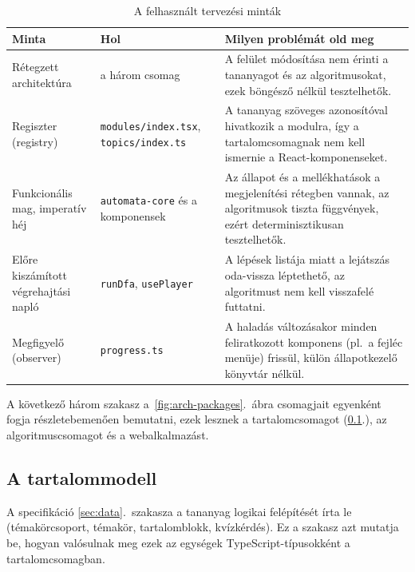 \begin{table}[H]
    \centering
    \begin{tabularx}{\textwidth}{|>{\raggedright\arraybackslash}p{3.2cm}|>{\raggedright\arraybackslash}p{3.6cm}|X|}
        \hline
        \textbf{Minta} & \textbf{Hol} & \textbf{Milyen problémát old meg} \\ \hline
        Rétegzett architektúra & a három csomag &
            A felület módosítása nem érinti a tananyagot és az
            algoritmusokat, ezek böngésző nélkül tesztelhetők. \\ \hline
        Regiszter (registry) & \texttt{modules/index.tsx}, \texttt{topics/index.ts} &
            A tananyag szöveges azonosítóval hivatkozik a modulra, így a
            tartalomcsomagnak nem kell ismernie a React-komponenseket. \\ \hline
        Funkcionális mag, imperatív héj & \texttt{automata-core} és a komponensek &
            Az állapot és a mellékhatások a megjelenítési rétegben vannak, az
            algoritmusok tiszta függvények, ezért determinisztikusan tesztelhetők. \\ \hline
        Előre kiszámított végrehajtási napló & \texttt{runDfa}, \texttt{usePlayer} &
            A lépések listája miatt a lejátszás oda-vissza léptethető, az
            algoritmust nem kell visszafelé futtatni. \\ \hline
        Megfigyelő (observer) & \texttt{progress.ts} &
            A haladás változásakor minden feliratkozott komponens (pl.\ a
            fejléc menüje) frissül, külön állapotkezelő könyvtár nélkül. \\ \hline
    \end{tabularx}
    \caption{A felhasznált tervezési minták}
    \label{tab:arch-patterns}
\end{table}
A következő három szakasz a~\ref{fig:arch-packages}.~ábra
 csomagjait egyenként fogja részletebemenően bemutatni, ezek lesznek
  a tartalomcsomagot (\ref{sec:content-design}.), az algoritmuscsomagot és a webalkalmazást.

\subsection{A tartalommodell}
\label{sec:content-design}

A specifikáció \ref{sec:data}.~szakasza a tananyag logikai felépítését
írta le (témakörcsoport, témakör, tartalomblokk, kvízkérdés). Ez a
szakasz azt mutatja be, hogyan valósulnak meg ezek az egységek
TypeScript-típusokként a tartalomcsomagban.

